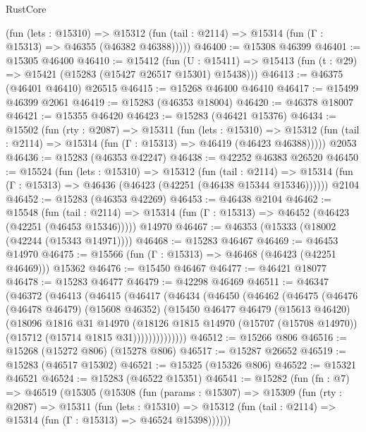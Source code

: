 \begin{lexlean}{RustCore}
\begin{coremodule}
      (fun (lets : @15310) =>
      @15312 (fun (tail : @2114) => @15314 (fun (Γ : @15313) => @46355 (@46382 @46388)))))
@46400 := @15308 @46399
@46401 := @15305 @46400
@46410 := @15412
    (fun (U : @15411) => @15413 (fun (t : @29) => @15421 (@15283 (@15427 @26517 @15301) @15438)))
@46413 := @46375 (@46401 @46410) @26515
@46415 := @15268 @46400 @46410
@46417 := @15499 @46399 @2061
@46419 := @15283 (@46353 @18004)
@46420 := @46378 @18007
@46421 := @15355 @46420
@46423 := @15283 (@46421 @15376)
@46434 := @15502
    (fun (rty : @2087) =>
    @15311
      (fun (lets : @15310) =>
      @15312 (fun (tail : @2114) => @15314 (fun (Γ : @15313) => @46419 (@46423 @46388)))))
    @2053
@46436 := @15283 (@46353 @42247)
@46438 := @42252 @46383 @26520
@46450 := @15524
    (fun (lets : @15310) =>
    @15312
      (fun (tail : @2114) =>
      @15314 (fun (Γ : @15313) => @46436 (@46423 (@42251 (@46438 @15344 @15346))))))
    @2104
@46452 := @15283 (@46353 @42269)
@46453 := @46438 @2104
@46462 := @15548
    (fun (tail : @2114) => @15314 (fun (Γ : @15313) => @46452 (@46423 (@42251 (@46453 @15346)))))
    @14970
@46467 := @46353 (@15333 (@18002 (@42244 (@15343 @14971))))
@46468 := @15283 @46467
@46469 := @46453 @14970
@46475 := @15566 (fun (Γ : @15313) => @46468 (@46423 (@42251 @46469))) @15362
@46476 := @15450 @46467
@46477 := @46421 @18077
@46478 := @15283 @46477
@46479 := @42298 @46469
@46511 := @46347
    (@46372
      (@46413
        (@46415
          (@46417
            (@46434
              (@46450
                (@46462
                  (@46475
                    (@46476
                      (@46478 @46479)
                      (@15608 @46352)
                      (@15450
                        @46477
                        @46479
                        (@15613 @46420)
                        (@18096
                          @1816
                          @31
                          @14970
                          (@18126
                            @1815
                            @14970
                            (@15707 (@15708 @14970))
                            (@15712 (@15714 @1815 @31))))))))))))))
@46512 := @15266 @806
@46516 := @15268 (@15272 @806) (@15278 @806)
@46517 := @15287 @26652
@46519 := @15283 (@46517 @15302)
@46521 := @15325 (@15326 @806)
@46522 := @15321 @46521
@46524 := @15283 (@46522 @15351)
@46541 := @15282
    (fun (fn : @7) =>
    @46519
      (@15305
        (@15308
          (fun (params : @15307) =>
          @15309
            (fun (rty : @2087) =>
            @15311
              (fun (lets : @15310) =>
              @15312 (fun (tail : @2114) => @15314 (fun (Γ : @15313) => @46524 @15398))))))

\end{coremodule}
\end{lexlean}
